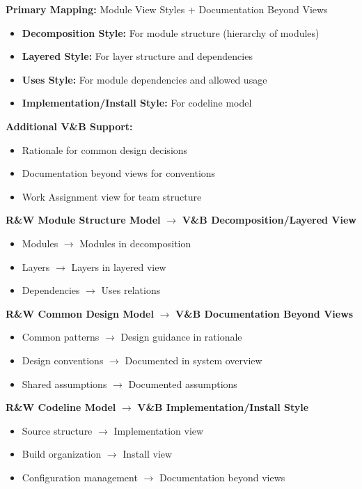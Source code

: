 \documentclass[11pt]{article}
\begin{document}
\begin{vbbox}
\textbf{Primary Mapping:} Module View Styles + Documentation Beyond Views

\begin{itemize}
    \item \textbf{Decomposition Style:} For module structure (hierarchy of modules)
    \item \textbf{Layered Style:} For layer structure and dependencies
    \item \textbf{Uses Style:} For module dependencies and allowed usage
    \item \textbf{Implementation/Install Style:} For codeline model
\end{itemize}

\textbf{Additional V\&B Support:}
\begin{itemize}
    \item Rationale for common design decisions
    \item Documentation beyond views for conventions
    \item Work Assignment view for team structure
\end{itemize}
\end{vbbox}

\begin{mappingbox}

\textbf{R\&W Module Structure Model} $\rightarrow$ \textbf{V\&B Decomposition/Layered View}
\begin{itemize}[nosep]
    \item Modules $\rightarrow$ Modules in decomposition
    \item Layers $\rightarrow$ Layers in layered view
    \item Dependencies $\rightarrow$ Uses relations
\end{itemize}

\textbf{R\&W Common Design Model} $\rightarrow$ \textbf{V\&B Documentation Beyond Views}
\begin{itemize}[nosep]
    \item Common patterns $\rightarrow$ Design guidance in rationale
    \item Design conventions $\rightarrow$ Documented in system overview
    \item Shared assumptions $\rightarrow$ Documented assumptions
\end{itemize}

\textbf{R\&W Codeline Model} $\rightarrow$ \textbf{V\&B Implementation/Install Style}
\begin{itemize}[nosep]
    \item Source structure $\rightarrow$ Implementation view
    \item Build organization $\rightarrow$ Install view
    \item Configuration management $\rightarrow$ Documentation beyond views
\end{itemize}
\end{mappingbox}
\end{document}
